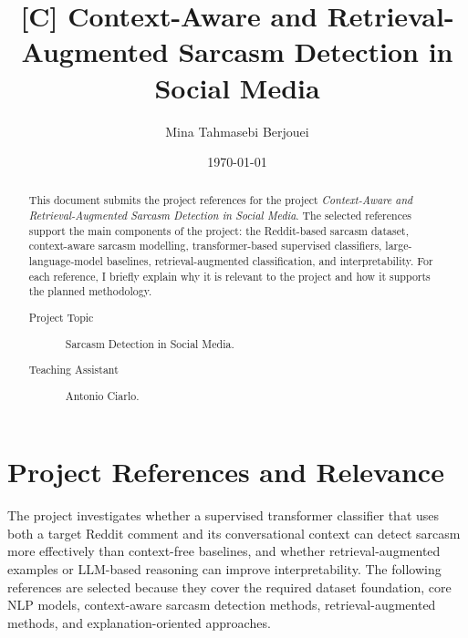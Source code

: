 \documentclass[%
 reprint,
 amsmath,amssymb,
 aps,
]{revtex4-2}
\begin{document}
\title{[C] Context-Aware and Retrieval-Augmented Sarcasm Detection in Social Media}

\author{Mina Tahmasebi Berjouei}

\date{\today}

\begin{abstract}
This document submits the project references for the project \emph{Context-Aware and Retrieval-Augmented Sarcasm Detection in Social Media}. The selected references support the main components of the project: the Reddit-based sarcasm dataset, context-aware sarcasm modelling, transformer-based supervised classifiers, large-language-model baselines, retrieval-augmented classification, and interpretability. For each reference, I briefly explain why it is relevant to the project and how it supports the planned methodology.

\begin{description}
\item[Project Topic]
{Sarcasm Detection in Social Media.}
\item[Teaching Assistant]
{Antonio Ciarlo.}
\end{description}
\end{abstract}

\maketitle

\section{Project References and Relevance}

The project investigates whether a supervised transformer classifier that uses both a target Reddit comment and its conversational context can detect sarcasm more effectively than context-free baselines, and whether retrieval-augmented examples or LLM-based reasoning can improve interpretability. The following references are selected because they cover the required dataset foundation, core NLP models, context-aware sarcasm detection methods, retrieval-augmented methods, and explanation-oriented approaches.
\end{document}
